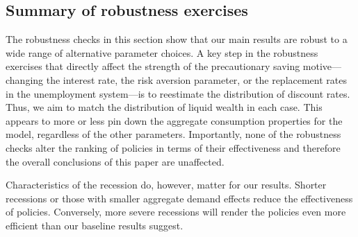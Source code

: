 \documentclass[\latexroot/\projectname]{subfiles}
\begin{document}
%
%

\hypertarget{summary-of-robustness-exercises}{}\par\subsection*{Summary of robustness exercises}
\whenintegrated{\label{sec:robust_summary}} %

The robustness checks in this section show that our main results are robust to a wide range of alternative parameter choices.
A key step in the robustness exercises that directly affect the strength of the precautionary saving motive---changing the interest rate, the risk aversion parameter, or the replacement rates in the unemployment system---is to reestimate the distribution of discount rates.
Thus, we aim to match the distribution of liquid wealth in each case.
This appears to more or less pin down the aggregate consumption properties for the model, regardless of the other parameters.
Importantly, none of the robustness checks alter the ranking of policies in terms of their effectiveness and therefore the overall conclusions of this paper are unaffected.

Characteristics of the recession do, however, matter for our results.
Shorter recessions or those with smaller aggregate demand effects reduce the effectiveness of policies.
Conversely, more severe recessions will render the policies even more efficient than our baseline results suggest.

\smartbib
\end{document}

